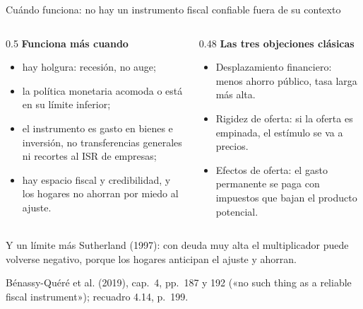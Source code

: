 \documentclass[aspectratio=169,11pt]{beamer}
\newcommand{\fuente}[1]{\par\vfill{\small\color{cGris}#1\par}}
\newcommand{\BQ}{Bénassy-Quéré et al. (2019), cap.~4}
\begin{document}
\begin{frame}{Cuándo funciona: no hay un instrumento fiscal confiable fuera de su contexto}
  \begin{columns}[T]
    \begin{column}{0.5\textwidth}
      \small
      \textbf{Funciona más cuando}
      \begin{itemize}
        \item hay holgura: recesión, no auge;
        \item la política monetaria acomoda o está en su límite inferior;
        \item el instrumento es gasto en bienes e inversión, no transferencias generales ni recortes al ISR de empresas;
        \item hay espacio fiscal y credibilidad, y los hogares no ahorran por miedo al ajuste.
      \end{itemize}
    \end{column}
    \begin{column}{0.48\textwidth}
      \small
      \textbf{Las tres objeciones clásicas}
      \begin{itemize}
        \item Desplazamiento financiero: menos ahorro público, tasa larga más alta.
        \item Rigidez de oferta: si la oferta es empinada, el estímulo se va a precios.
        \item Efectos de oferta: el gasto permanente se paga con impuestos que bajan el producto potencial.
      \end{itemize}
    \end{column}
  \end{columns}
  \pause
  \begin{block}{Y un límite más}
    Sutherland (1997): con deuda muy alta el multiplicador puede volverse negativo, porque los hogares anticipan el ajuste y ahorran.
  \end{block}
  \fuente{\BQ, pp.~187 y 192 («no such thing as a reliable fiscal instrument»); recuadro 4.14, p.~199.}
\end{frame}
\end{document}
